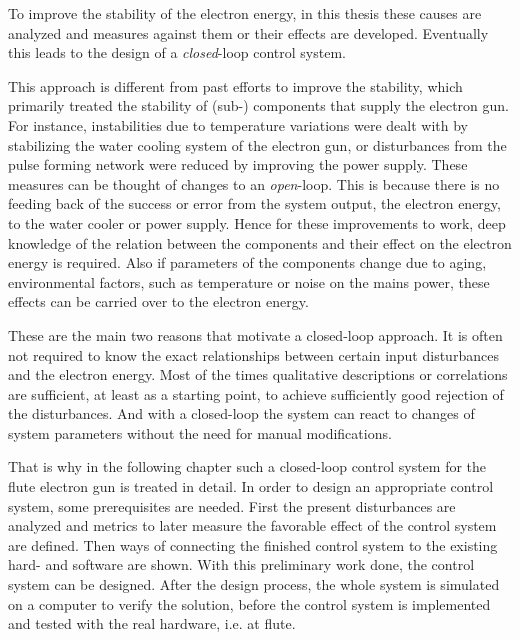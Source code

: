 To improve the stability of the electron energy, in this thesis these causes are analyzed and measures against them or their effects are developed. Eventually this leads to the design of a \textit{closed}-loop control system. 

This approach is different from past efforts to improve the stability, which primarily treated the stability of (sub-) components that supply the electron gun. For instance, instabilities due to temperature variations were dealt with by stabilizing the water cooling system of the electron gun, or disturbances from the pulse forming network were reduced by improving the power supply. These measures can be thought of changes to an \textit{open}-loop. This is because there is no feeding back of the success or error from the system output, the electron energy, to the water cooler or power supply. Hence for these improvements to work, deep knowledge of the relation between the components and their effect on the electron energy is required. Also if parameters of the components change due to aging, environmental factors, such as temperature or noise on the mains power, these effects can be carried over to the electron energy.

These are the main two reasons that motivate a closed-loop approach. It is often not required to know the exact relationships between certain input disturbances and the electron energy. Most of the times qualitative descriptions or correlations are sufficient, at least as a starting point, to achieve sufficiently good rejection of the disturbances. And with a closed-loop the system can react to changes of system parameters without the need for manual modifications.

That is why in the following chapter such a closed-loop control system for the \gls{flute} electron gun is treated in detail. In order to design an appropriate control system, some prerequisites are needed. First the present disturbances are analyzed and metrics to later measure the favorable effect of the control system are defined. Then ways of connecting the finished control system to the existing hard- and software are shown. With this preliminary work done, the control system can be designed. After the design process, the whole system is simulated on a computer to verify the solution, before the control system is implemented and tested with the real hardware, i.e. at \gls{flute}.

